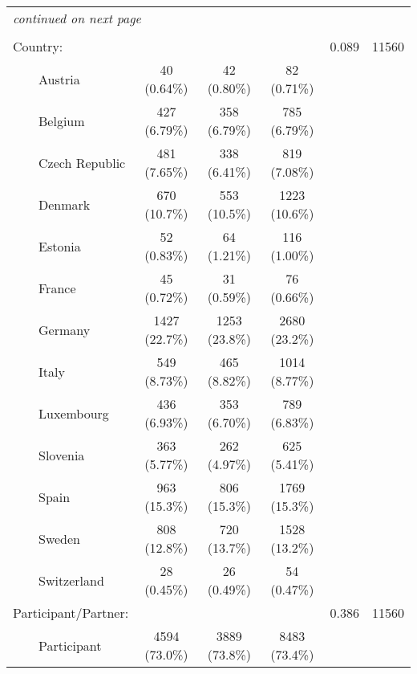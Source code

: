 \documentclass[a4paper,12pt, titlepage]{article}\usepackage[]{graphicx}\usepackage[]{color}
\begin{document}
\begin{landscape}
\begin{small}
\begin{longtable}{lccccc}
    \hline
    \hline  
    \endhead   
    \hline
    \multicolumn{6}{l}{\textit{continued on next page}} \\ 
    \endfoot   
    \multicolumn{6}{l}{}  \\ 
    \endlastfoot 
    Country: &                     &                     &                     &   0.089   & 11560\\ 
$\qquad$Austria &     40 (0.64\%)      &     42 (0.80\%)      &     82 (0.71\%)      &           &      \\ 
$\qquad$Belgium &     427 (6.79\%)     &     358 (6.79\%)     &     785 (6.79\%)     &           &      \\ 
$\qquad$Czech Republic &     481 (7.65\%)     &     338 (6.41\%)     &     819 (7.08\%)     &           &      \\ 
$\qquad$Denmark &     670 (10.7\%)     &     553 (10.5\%)     &    1223 (10.6\%)     &           &      \\ 
$\qquad$Estonia &     52 (0.83\%)      &     64 (1.21\%)      &     116 (1.00\%)     &           &      \\ 
$\qquad$France &     45 (0.72\%)      &     31 (0.59\%)      &     76 (0.66\%)      &           &      \\ 
$\qquad$Germany &    1427 (22.7\%)     &    1253 (23.8\%)     &    2680 (23.2\%)     &           &      \\ 
$\qquad$Italy &     549 (8.73\%)     &     465 (8.82\%)     &    1014 (8.77\%)     &           &      \\ 
$\qquad$Luxembourg &     436 (6.93\%)     &     353 (6.70\%)     &     789 (6.83\%)     &           &      \\ 
$\qquad$Slovenia &     363 (5.77\%)     &     262 (4.97\%)     &     625 (5.41\%)     &           &      \\ 
$\qquad$Spain &     963 (15.3\%)     &     806 (15.3\%)     &    1769 (15.3\%)     &           &      \\ 
$\qquad$Sweden &     808 (12.8\%)     &     720 (13.7\%)     &    1528 (13.2\%)     &           &      \\ 
$\qquad$Switzerland &     28 (0.45\%)      &     26 (0.49\%)      &     54 (0.47\%)      &           &      \\ 
Participant/Partner: &                     &                     &                     &   0.386   & 11560\\ 
$\qquad$Participant &    4594 (73.0\%)     &    3889 (73.8\%)     &    8483 (73.4\%)     &           &      \\ 

\end{longtable}
\end{small}
\end{landscape}
\end{document}
